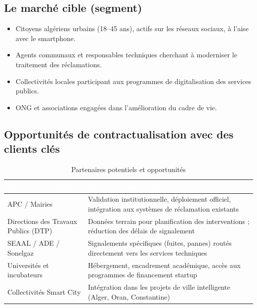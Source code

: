 \documentclass[12pt,a4paper]{report}
\newcommand{\thdcell}[1]{%
  \cellcolor{tabhead}\textbf{\textcolor{white}{#1}}%
}
\begin{document}
\subsection{Le marché cible (segment)}
\begin{itemize}
  \item Citoyens algériens urbains (18--45 ans), actifs sur les réseaux sociaux,
        à l'aise avec le smartphone.
  \item Agents communaux et responsables techniques cherchant à moderniser le
        traitement des réclamations.
  \item Collectivités locales participant aux programmes de digitalisation des
        services publics.
  \item ONG et associations engagées dans l'amélioration du cadre de vie.
\end{itemize}

\subsection{Opportunités de contractualisation avec des clients clés}

\begin{table}[H]
  \centering
  \caption{Partenaires potentiels et opportunités}
  \renewcommand{\arraystretch}{1.4}
  \begin{tabularx}{\linewidth}{lX}
    \toprule
    \rowcolor{primary}
    \thdcell{Partenaire potentiel} & \thdcell{Apport et opportunité} \\
    \midrule

    APC / Mairies &
    Validation institutionnelle, déploiement officiel, intégration aux
    systèmes de réclamation existants \\

    \rowcolor{lightgray}
    Directions des Travaux Publics (DTP) &
    Données terrain pour planification des interventions ; réduction des
    délais de signalement \\

    SEAAL / ADE / Sonelgaz &
    Signalements spécifiques (fuites, pannes) routés directement vers les
    services techniques \\

    \rowcolor{lightgray}
    Universités et incubateurs &
    Hébergement, encadrement académique, accès aux programmes de financement
    startup \\

    Collectivités Smart City &
    Intégration dans les projets de ville intelligente (Alger, Oran,
    Constantine) \\

    \bottomrule
  \end{tabularx}
\end{table}
\end{document}
